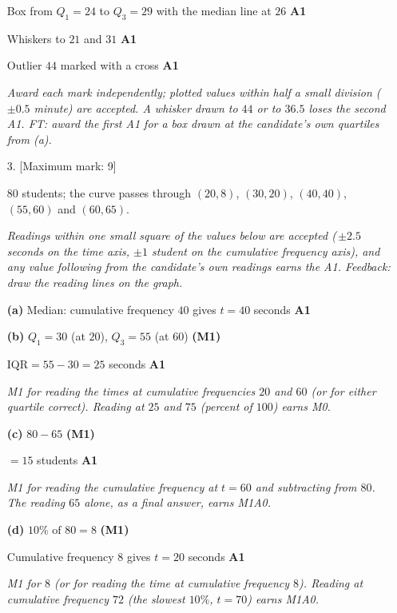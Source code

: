 \documentclass[12pt, twoside]{article}
\begin{document}
\begin{enumerate}[itemsep=0.3cm]
Box from $Q_{1} = 24$ to $Q_{3} = 29$ with the median line at $26$
\hfill \textbf{A1}

Whiskers to $21$ and $31$ \hfill \textbf{A1}

Outlier $44$ marked with a cross \hfill \textbf{A1}

\emph{Award each mark independently; plotted values within half a small
division ($\pm 0.5$ minute) are accepted. A whisker drawn to $44$ or to
$36.5$ loses the second A1. FT: award the first A1 for a box drawn at the
candidate's own quartiles from (a).}

\newpage

\item[3.] [Maximum mark: 9]

$80$ students; the curve passes through $(20, 8)$, $(30, 20)$, $(40, 40)$,
$(55, 60)$ and $(60, 65)$.

\emph{Readings within one small square of the values below are accepted
(\,$\pm 2.5$ seconds on the time axis, $\pm 1$ student on the cumulative
frequency axis), and any value following from the candidate's own readings
earns the A1. Feedback: draw the reading lines on the graph.}

\textbf{(a)} Median: cumulative frequency $40$ gives $t = 40$ seconds
\hfill \textbf{A1}

\textbf{(b)} $Q_{1} = 30$ (at $20$), \quad $Q_{3} = 55$ (at $60$)
\hfill \textbf{(M1)}

$\text{IQR} = 55 - 30 = 25$ seconds \hfill \textbf{A1}

\emph{M1 for reading the times at cumulative frequencies $20$ and $60$ (or
for either quartile correct). Reading at $25$ and $75$ (percent of $100$)
earns M0.}

\textbf{(c)} $80 - 65$ \hfill \textbf{(M1)}

$= 15$ students \hfill \textbf{A1}

\emph{M1 for reading the cumulative frequency at $t = 60$ and subtracting
from $80$. The reading $65$ alone, as a final answer, earns M1A0.}

\textbf{(d)} $10\% \text{ of } 80 = 8$ \hfill \textbf{(M1)}

Cumulative frequency $8$ gives $t = 20$ seconds \hfill \textbf{A1}

\emph{M1 for $8$ (or for reading the time at cumulative frequency $8$).
Reading at cumulative frequency $72$ (the slowest $10\%$, $t = 70$) earns
M1A0.}


\end{enumerate}
\end{document}
